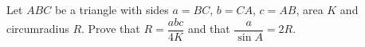 Let $ABC$ be a triangle with sides $a=BC$, $b=CA$, $c=AB$, area $K$ and circumradius $R$. Prove that $R=\dfrac{abc}{4K}$ and that $\dfrac a{\sin A}=2R$.
